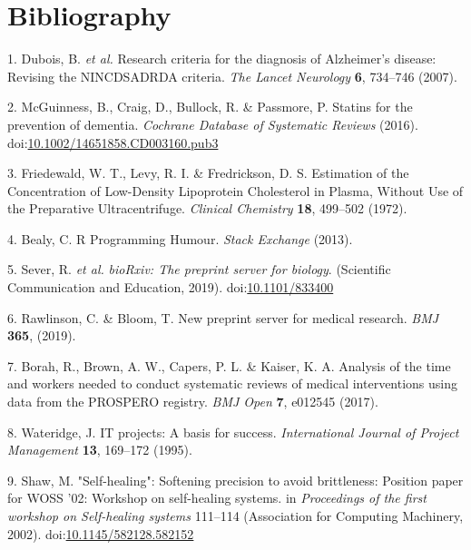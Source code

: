 \documentclass[a4paper, twoside]{templates/ociamthesis}
\begin{document}
\hypertarget{bibliography}{%
\chapter{Bibliography}\label{bibliography}}

\hypertarget{refs}{}
\leavevmode\hypertarget{ref-dubois2007}{}%
1. Dubois, B. \emph{et al.} Research criteria for the diagnosis of Alzheimer's disease: Revising the NINCDSADRDA criteria. \emph{The Lancet Neurology} \textbf{6}, 734--746 (2007).

\leavevmode\hypertarget{ref-mcguinness2016b}{}%
2. McGuinness, B., Craig, D., Bullock, R. \& Passmore, P. Statins for the prevention of dementia. \emph{Cochrane Database of Systematic Reviews} (2016). doi:\href{https://doi.org/10.1002/14651858.CD003160.pub3}{10.1002/14651858.CD003160.pub3}

\leavevmode\hypertarget{ref-friedewald1972}{}%
3. Friedewald, W. T., Levy, R. I. \& Fredrickson, D. S. Estimation of the Concentration of Low-Density Lipoprotein Cholesterol in Plasma, Without Use of the Preparative Ultracentrifuge. \emph{Clinical Chemistry} \textbf{18}, 499--502 (1972).

\leavevmode\hypertarget{ref-bealy2013}{}%
4. Bealy, C. R Programming Humour. \emph{Stack Exchange} (2013).

\leavevmode\hypertarget{ref-sever2019}{}%
5. Sever, R. \emph{et al.} \emph{bioRxiv: The preprint server for biology}. (Scientific Communication and Education, 2019). doi:\href{https://doi.org/10.1101/833400}{10.1101/833400}

\leavevmode\hypertarget{ref-rawlinson2019}{}%
6. Rawlinson, C. \& Bloom, T. New preprint server for medical research. \emph{BMJ} \textbf{365}, (2019).

\leavevmode\hypertarget{ref-borah2017}{}%
7. Borah, R., Brown, A. W., Capers, P. L. \& Kaiser, K. A. Analysis of the time and workers needed to conduct systematic reviews of medical interventions using data from the PROSPERO registry. \emph{BMJ Open} \textbf{7}, e012545 (2017).

\leavevmode\hypertarget{ref-wateridge1995}{}%
8. Wateridge, J. IT projects: A basis for success. \emph{International Journal of Project Management} \textbf{13}, 169--172 (1995).

\leavevmode\hypertarget{ref-shaw2002}{}%
9. Shaw, M. "Self-healing": Softening precision to avoid brittleness: Position paper for WOSS '02: Workshop on self-healing systems. in \emph{Proceedings of the first workshop on Self-healing systems} 111--114 (Association for Computing Machinery, 2002). doi:\href{https://doi.org/10.1145/582128.582152}{10.1145/582128.582152}
\end{document}
